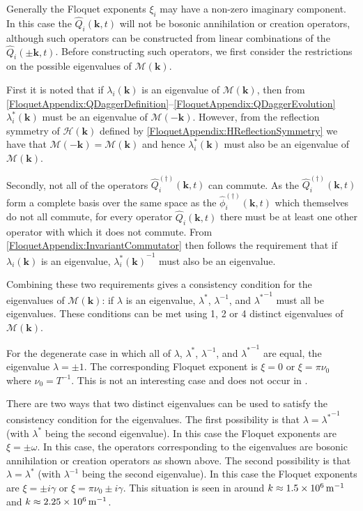 Generally the Floquet exponents $\xi_i$ may have a non-zero imaginary component. In this case the $\hat{Q}_i(\bm{k}, t)$ will not be bosonic annihilation or creation operators, although such operators can be constructed from linear combinations of the $\hat{Q}_i(\pm\bm{k}, t)$. Before constructing such operators, we first consider the restrictions on the possible eigenvalues of $\mathcal{M}(\bm{k})$.

First it is noted that if $\lambda_i(\bm{k})$ is an eigenvalue of $\mathcal{M}(\bm{k})$, then from \eqref{FloquetAppendix:QDaggerDefinition}--\eqref{FloquetAppendix:QDaggerEvolution} $\lambda_i^*(\bm{k})$ must be an eigenvalue of $\mathcal{M}(-\bm{k})$. However, from the reflection symmetry of $\mathcal{H}(\bm{k})$ defined by \eqref{FloquetAppendix:HReflectionSymmetry} we have that $\mathcal{M}(-\bm{k}) = \mathcal{M}(\bm{k})$ and hence $\lambda_i^*(\bm{k})$ must also be an eigenvalue of $\mathcal{M}(\bm{k})$.

Secondly, not all of the operators $\hat{Q}_i^{(\dagger)}(\bm{k}, t)$ can commute. As the $\hat{Q}_i^{(\dagger)}(\bm{k}, t)$ form a complete basis over the same space as the $\hat{\phi}_i^{(\dagger)}(\bm{k}, t)$ which themselves do not all commute, for every operator $\hat{Q}_i(\bm{k}, t)$ there must be at least one other operator with which it does not commute. From \eqref{FloquetAppendix:InvariantCommutator} then follows the requirement that if $\lambda_i(\bm{k})$ is an eigenvalue,   ${\lambda_i^*(\bm{k})}^{-1}$ must also be an eigenvalue.

Combining these two requirements gives a consistency condition for the eigenvalues of $\mathcal{M}(\bm{k})$: if $\lambda$ is an eigenvalue, $\lambda^*$, $\lambda^{-1}$, and ${\lambda^*}^{-1}$ must all be eigenvalues. These conditions can be met using 1, 2 or 4 distinct eigenvalues of $\mathcal{M}(\bm{k})$.

For the degenerate case in which all of $\lambda$, $\lambda^*$, $\lambda^{-1}$, and ${\lambda^*}^{-1}$ are equal, the eigenvalue $\lambda = \pm 1$. The corresponding Floquet exponent is $\xi = 0$ or $\xi = \pi\nu_0$ where $\displaystyle \nu_0 = T^{-1}$. This is not an interesting case and does not occur in .

There are two ways that two distinct eigenvalues can be used to satisfy the consistency condition for the eigenvalues. The first possibility is that $\lambda = {\lambda^*}^{-1}$ (with $\lambda^*$ being the second eigenvalue). In this case the Floquet exponents are $\xi = \pm \omega$. In this case, the operators corresponding to the eigenvalues are bosonic annihilation or creation operators as shown above. The second possibility is that $\lambda = \lambda^*$ (with $\lambda^{-1}$ being the second eigenvalue). In this case the Floquet exponents are $\xi = \pm i\gamma$ or $\xi = \pi \nu_0 \pm i\gamma$. This situation is seen in  around $k \approx \unit[1.5 \times 10^6]{m}^{-1}$ and $k \approx \unit[2.25 \times 10^6]{m}^{-1}$.

